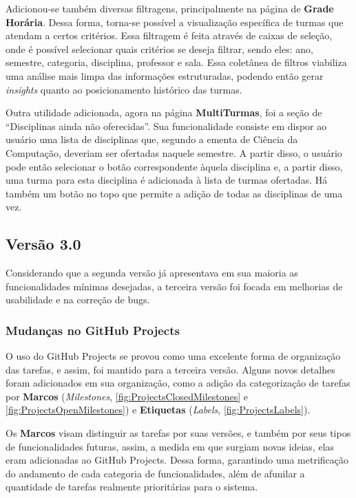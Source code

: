 Adicionou-se também diversas filtragens, principalmente na página de \textbf{Grade Horária}. Dessa forma, torna-se possível a visualização específica de turmas que atendam a certos critérios. Essa filtragem é feita através de caixas de seleção, onde é possível selecionar quais critérios se deseja filtrar, sendo eles: ano, semestre, categoria, disciplina, professor e sala. Essa coletânea de filtros viabiliza uma análise mais limpa das informações estruturadas, podendo então gerar \textit{insights} quanto ao posicionamento histórico das turmas.

Outra utilidade adicionada, agora na página \textbf{MultiTurmas}, foi a seção de ``Disciplinas ainda não oferecidas''. Sua funcionalidade consiste em dispor ao usuário uma lista de disciplinas que, segundo a ementa de Ciência da Computação, deveriam ser ofertadas naquele semestre. A partir disso, o usuário pode então selecionar o botão correspondente àquela disciplina e, a partir disso, uma turma para esta disciplina é adicionada à lista de turmas ofertadas. Há também um botão no topo que permite a adição de todas as disciplinas de uma vez.

\subsection{Versão 3.0} \label{subsec:MVP3} %

Considerando que a segunda versão já apresentava em sua maioria as funcionalidades mínimas desejadas, a terceira versão foi focada em melhorias de usabilidade e na correção de bugs.

\subsubsection*{Mudanças no GitHub Projects} \label{sssec:Mudanças no GitHub Projects}

O uso do GitHub Projects se provou como uma excelente forma de organização das tarefas, e assim, foi mantido para a terceira versão. Alguns novos detalhes foram adicionados em sua organização, como a adição da categorização de tarefas por \textbf{Marcos} (\textit{Milestones}, \autoref{fig:ProjectsClosedMilestones} e \autoref{fig:ProjectsOpenMilestones}) e \textbf{Etiquetas} (\textit{Labels}, \autoref{fig:ProjectsLabels}).

 \label{ssssec:Marcos e Etiquetas}

Os \textbf{Marcos} visam distinguir as tarefas por suas versões, e também por seus tipos de funcionalidades futuras, assim, a medida em que surgiam novas ideias, elas eram adicionadas ao GitHub Projects. Dessa forma, garantindo uma metrificação do andamento de cada categoria de funcionalidades, além de afunilar a quantidade de tarefas realmente prioritárias para o sistema.

